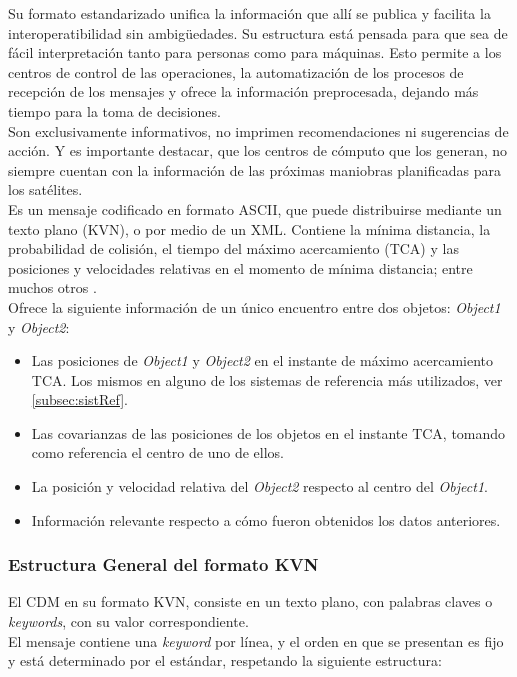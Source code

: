 Su formato estandarizado unifica la informaci\'on que all\'i se publica y facilita la interoperatibilidad sin ambig\"{u}edades. Su estructura est\'a pensada para que sea de f\'acil interpretaci\'on tanto para personas como para m\'aquinas. Esto permite a los centros de control de las operaciones, la automatizaci\'on de los procesos de recepci\'on de los mensajes y ofrece la informaci\'on preprocesada, dejando m\'as tiempo para la toma de decisiones.\\

Son exclusivamente informativos, no imprimen recomendaciones ni sugerencias de acci\'on.
Y es importante destacar, que los centros de c\'omputo que los generan, no siempre cuentan con la informaci\'on de las pr\'oximas maniobras planificadas para los sat\'elites.\\

Es un mensaje codificado en formato ASCII, que puede distribuirse mediante un texto plano (KVN), o por medio de un XML. Contiene la m\'inima distancia, la probabilidad de colisi\'on, el tiempo del m\'aximo acercamiento (TCA) y las posiciones y velocidades relativas en el momento de m\'inima distancia; entre muchos otros \citep{CDM}.\\

Ofrece la siguiente informaci\'on de un \'unico encuentro entre dos objetos: {\it{Object1}} y {\it{Object2}}:
\begin{itemize}
\item Las posiciones de  {\it{Object1}} y  {\it{Object2}} en el instante de m\'aximo acercamiento TCA. Los mismos en alguno de los sistemas de referencia m\'as utilizados, ver \ref{subsec:sistRef}.
\item Las covarianzas de las posiciones de los objetos en el instante TCA, tomando como referencia el centro de uno de ellos.
\item La posici\'on y velocidad relativa del {\it{Object2}} respecto al centro del {\it{Object1}}.
\item Informaci\'on relevante respecto a c\'omo fueron obtenidos los datos anteriores.
\end{itemize}


\subsubsection*{Estructura General del formato KVN}
El CDM en su formato KVN, consiste en un texto plano, con palabras claves o {\it{keywords}}, con su valor correspondiente.\\
El mensaje contiene una {\it{keyword}} por l\'inea, y el orden en que se presentan es fijo y est\'a determinado por el est\'andar, respetando la siguiente estructura:\\

